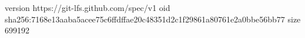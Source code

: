 version https://git-lfs.github.com/spec/v1
oid sha256:7168e13aaba5acee75c6ffdffae20c48351d2c1f29861a80761e2a0bbe56bb77
size 699192
